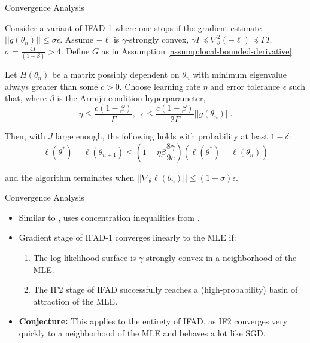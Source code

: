 \documentclass{beamer}
\begin{document}
\begin{frame}{Convergence Analysis}
    \begin{prop}
        \label{thm:convergence}
        
        Consider a variant of IFAD-1 where one stops if the gradient estimate $||g(\theta_n)|| \leq \sigma \epsilon$. Assume $-\ell$ is $\gamma$-strongly convex, $\gamma I \preceq \nabla_\theta^2 (-\ell) \preceq \Gamma I$. $\sigma = \frac{4 \Gamma}{(1-\beta)}> 4$. Define $G$ as in Assumption \ref{assump:local-bounded-derivative}.
        
        Let $H(\theta_n)$ be a matrix possibly dependent on $\theta_n$ with minimum eigenvalue always greater than some $c>0$. Choose learning rate $\eta$ and error tolerance $\epsilon$ such that, where $\beta$ is the Armijo condition hyperparameter,
        \begin{equation*}
            \eta \leq \frac{c(1-\beta)}{\Gamma}, \;\; \epsilon \leq \frac{c(1-\beta)}{2\Gamma}||g(\theta_n)||.
        \end{equation*}
        
        Then, with $J$ large enough, the following holds with probability at least $1-\delta$:
        \begin{equation*}
        \ell(\theta^*) - \ell(\theta_{n+1}) \leq \left(1-\eta\beta\frac{8\gamma}{9c}\right)(\ell(\theta^*)-\ell(\theta_n))
        \end{equation*}
        
        and the algorithm terminates when $||\nabla_\theta \ell(\theta_n)|| \leq (1+\sigma) \epsilon$.
        \end{prop}
\end{frame}

\begin{frame}{Convergence Analysis}
    \begin{itemize}
        \item Similar to \cite{mahoney16}, uses concentration inequalities from \cite{delmoral2011ci}.
        \item Gradient stage of IFAD-1 converges linearly to the MLE if:
        \begin{enumerate}
            \item \pause The log-likelihood surface is $\gamma$-strongly convex in a neighborhood of the MLE.
            \item \pause The IF2 stage of IFAD successfully reaches a (high-probability) basin of attraction of the MLE. 
        \end{enumerate}
        \item \pause \textbf{Conjecture:} This applies to the entirety of IFAD, as IF2 converges very quickly to a neighborhood of the MLE and behaves a lot like SGD. 
    \end{itemize}
    
\end{frame}
\end{document}
